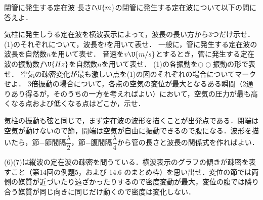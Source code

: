 \bsNeed{95mm}
\begin{reidaiunit}
\begin{reidai}{閉管に発生する定在波}
\hspace{1zw}長さ$l\U{m}$の閉管に発生する定在波について以下の問に答えよ．
\begin{komon}
 気柱に発生しうる定在波を横波表示によって，波長の長い方から3つだけ示せ．
 (1)のそれぞれについて，波長を$l$を用いて表せ．
 一般に，管に発生する定在波の波長を自然数$n$を用いて表せ．
 音速を$v\U{m/s}$とするとき，管に発生する定在波の振動数$f\U{Hz}$を自然数$n$を用いて表せ．
 (1)の各振動を$\bigcirc\bigcirc$振動の形で表せ．
 空気の疎密変化が最も激しい点を(1)の図のそれぞれの場合についてマークせよ．
 3倍振動の場合について，各点の空気の変位が最大となるある瞬間（2通りあり得るが，そのうちの一方を考えればよい）において，空気の圧力が最も高くなる点および低くなる点はどこか，示せ．
\end{komon}
\end{reidai}

\begin{sisinE}
気柱の振動も弦と同じで，まず定在波の波形を描くことが出発点である．{\gtfamily 閉端は空気が動けないので節，開端は空気が自由に振動できるので腹}になる．波形を描いたら，節−節間隔$\dfrac{\lambda}{2}$，節−腹間隔$\dfrac{\lambda}{4}$から管の長さと波長の関係式を作ればよい．

(6)(7)は縦波の定在波の疎密を問うている．横波表示のグラフの傾きが疎密を表すこと（第14回の例題5，および 14.6 のまとめ枠）を思い出せ．変位の節では両側の媒質が近づいたり遠ざかったりするので密度変動が最大，変位の腹では隣り合う媒質が同じ向きに同じだけ動くので密度は変化しない．
\end{sisinE}


\end{reidaiunit}
